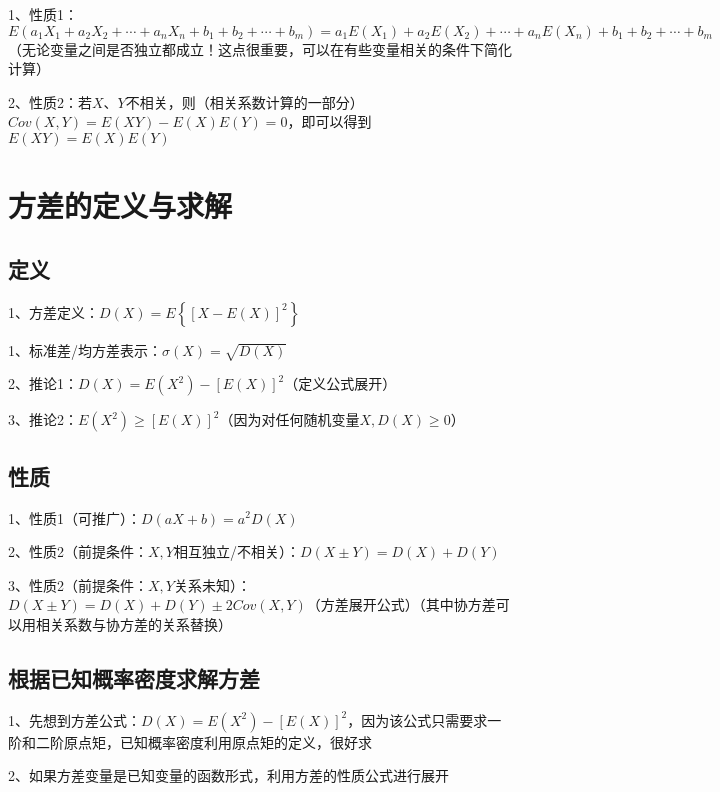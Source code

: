 1、性质1：$E(a_1X_1+a_2X_2+\cdots+a_nX_n+b_1+b_2+\cdots+b_m)=a_1E(X_1)+a_2E(X_2)+\cdots+a_nE(X_n)+b_1+b_2+\cdots+b_m$（无论变量之间是否独立都成立！这点很重要，可以在有些变量相关的条件下简化计算）

2、性质2：若$X$、$Y$不相关，则（相关系数计算的一部分）$C o v ( X , Y ) = E ( X Y ) - E ( X ) E ( Y ) =0$，即可以得到$E ( X Y ) = E ( X ) E ( Y )$

\section{方差的定义与求解}



\subsection{定义}

1、方差定义：$D(X)=E\left\{[X-E(X)]^{2}\right\}$

1、标准差/均方差表示：$\sigma(X)=\sqrt{D(X)}$

2、推论1：$D(X)=E\left(X^{2}\right)-[E(X)]^{2}$（定义公式展开）

3、推论2：$E\left(X^{2}\right) \geqslant[E(X)]^{2}$（因为对任何随机变量$X, D(X) \geqslant 0$）



\subsection{性质}

1、性质1（可推广）：$D(a X+b)=a^{2} D(X) $

2、性质2（前提条件：$X,Y$相互独立/不相关）：$D(X \pm Y)=D(X)+D(Y)$

3、性质2（前提条件：$X,Y$关系未知）：$D ( X \pm Y ) = D ( X ) + D ( Y ) \pm 2 Cov ( X , Y )  $（方差展开公式）（其中协方差可以用相关系数与协方差的关系替换）



\subsection{根据已知概率密度求解方差}

1、先想到方差公式：$D(X)=E\left(X^{2}\right)-[E(X)]^{2}$，因为该公式只需要求一阶和二阶原点矩，已知概率密度利用原点矩的定义，很好求

2、如果方差变量是已知变量的函数形式，利用方差的性质公式进行展开

